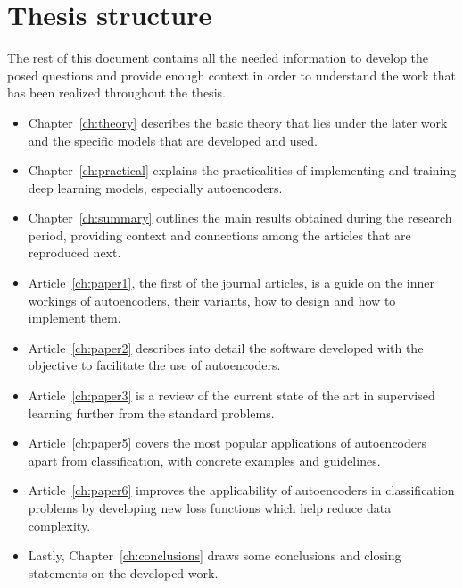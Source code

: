 \section{Thesis structure}

The rest of this document contains all the needed information to develop the posed questions and provide enough context in order to understand the work that has been realized throughout the thesis.

\begin{itemize}
    \item Chapter~\ref{ch:theory} describes the basic theory that lies under the later work and the specific models that are developed and used.
    \item Chapter~\ref{ch:practical} explains the practicalities of implementing and training deep learning models, especially autoencoders.
    \item Chapter~\ref{ch:summary} outlines the main results obtained during the research period, providing context and connections among the articles that are reproduced next.
    \item Article~\ref{ch:paper1}, the first of the journal articles, is a guide on the inner workings of autoencoders, their variants, how to design and how to implement them.
    \item Article~\ref{ch:paper2} describes into detail the software developed with the objective to facilitate the use of autoencoders.
    \item Article~\ref{ch:paper3} is a review of the current state of the art in supervised learning further from the standard problems.
    \item Article~\ref{ch:paper5} covers the most popular applications of autoencoders apart from classification, with concrete examples and guidelines.
    \item Article~\ref{ch:paper6} improves the applicability of autoencoders in classification problems by developing new loss functions which help reduce data complexity.
    \item Lastly, Chapter~\ref{ch:conclusions} draws some conclusions and closing statements on the developed work.
\end{itemize}